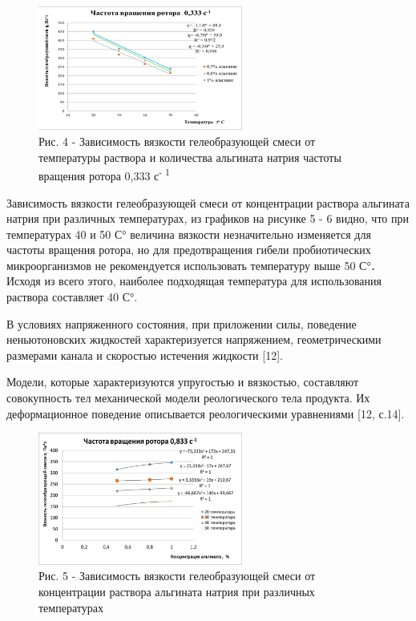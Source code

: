 \begin{figure}[H]
	\centering
	\includegraphics[width=0.6\textwidth]{assets/313}
	\caption*{Рис. 4 - Зависимость вязкости гелеобразующей смеси от
	температуры раствора и количества альгината натрия частоты вращения ротора 0,333
	с\textsuperscript{- 1}}
\end{figure}
\begin{multicols}{2}

Зависимость вязкости гелеобразующей смеси от концентрации раствора
альгината натрия при различных температурах, из графиков на рисунке 5 -
6 видно, что при температурах 40 и 50 С° величина вязкости незначительно
изменяется для частоты вращения ротора, но для предотвращения гибели
пробиотических микроорганизмов не рекомендуется использовать температуру
выше 50 С°\emph{{\bfseries .}} Исходя из всего этого, наиболее подходящая
температура для использования раствора составляет 40 С°.

В условиях напряженного состояния, при приложении силы, поведение
неньютоновских жидкостей характеризуется напряжением, геометрическими
размерами канала и скоростью истечения жидкости {[}12{]}.

Модели, которые характеризуются упругостью и вязкостью, составляют
совокупность тел механической модели реологического тела продукта. Их
деформационное поведение описывается реологическими уравнениями {[}12,
с.14{]}.
\end{multicols}

\begin{figure}[H]
	\centering
	\includegraphics[width=0.6\textwidth]{assets/314}
	\caption*{ Рис. 5 - Зависимость вязкости гелеобразующей смеси от
	концентрации раствора альгината натрия при различных температурах}
\end{figure}



